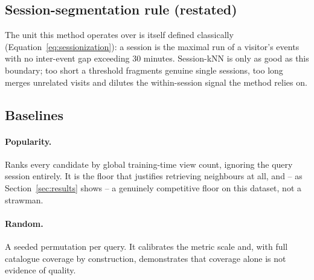 \subsection{Session-segmentation rule (restated)}

The unit this method operates over is itself defined classically
(Equation~\ref{eq:sessionization}): a session is the maximal run of a
visitor's events with no inter-event gap exceeding $30$ minutes. Session-kNN
is only as good as this boundary; too short a threshold fragments genuine
single sessions, too long merges unrelated visits and dilutes the
within-session signal the method relies on.

\subsection{Baselines}

\paragraph{Popularity.} Ranks every candidate by global training-time view
count, ignoring the query session entirely. It is the floor that justifies
retrieving neighbours at all, and -- as Section~\ref{sec:results} shows -- a
genuinely competitive floor on this dataset, not a strawman.

\paragraph{Random.} A seeded permutation per query. It calibrates the metric
scale and, with full catalogue coverage by construction, demonstrates that
coverage alone is not evidence of quality.
